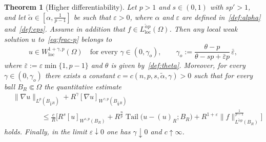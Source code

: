 \documentclass[10pt,a4paper]{amsart}
\newtheorem{theorem}{Theorem}
\DeclareMathOperator{\Tail}{Tail}
\renewcommand{\epsilon}{\varepsilon}
\begin{document}
\begin{theorem}[Higher differentiability]\label{thm:higher-diff}
Let $p>1$ and $s\in(0,1)$ with $sp'>1$, and let $\tilde\alpha\in[\alpha,\frac{1}{p-1}]$ be such that $\epsilon>0$, where $\alpha$ and $\epsilon$ are defined in~\eqref{def:alpha} and~\eqref{def:eps}. Assume in addition that
$f \in L^{\tilde{\alpha}p}_{\mathrm{loc}}(\Omega)$. Then any local weak solution $u$ to~\eqref{eq:frac-p}
belongs to
\begin{equation*}%
u \in W^{1+\gamma,p}_{\mathrm{loc}}(\Omega)
\quad \text{for every } \gamma \in (0,\gamma_o),
\qquad
\gamma_o := \frac{\theta-p}{\theta-sp+\bar\epsilon p}\,\bar\epsilon,
\end{equation*}
where $\bar\epsilon:=\epsilon \min\{1,p-1\}$ and $\theta$ is given by~\eqref{def:theta}.
Moreover, for every $\gamma\in(0,\gamma_o)$ there exists a constant
$c = c(n,p,s,\tilde{\alpha},\gamma)>0$ such that for every ball
$B_R\Subset\Omega$ the quantitative estimate
\begin{align*}
    &\|\nabla u\|_{L^p(B_{\frac12 R})}
    + R^\gamma [\nabla u]_{W^{\gamma,p}(B_{\frac12 R})}\\
    &\qquad\qquad\le
    \frac{c}{R}
    \bigg[
        R^s [u]_{W^{s,p}(B_R)}
        + R^{\frac{n}{p}}
        \Tail\big(u-(u)_{R}; B_R\big)  
        + R^{1+\epsilon}
        \|f\|_{L^{\tilde{\alpha}p}(B_R)}^{\frac{1}{p-1}}
    \bigg]
\end{align*}
holds. Finally, in the limit $\epsilon\downarrow0$ one has
$\gamma\downarrow 0$ and $c\uparrow\infty$.
\end{theorem}
\end{document}
